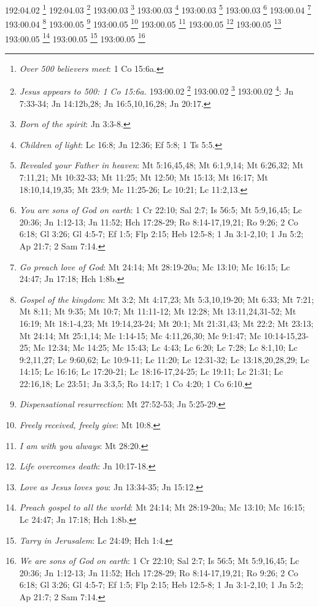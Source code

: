 192:04.02 \footnote{\textit{Over 500 believers meet}: 1 Co 15:6a.}
192:04.03 \footnote{\textit{Jesus appears to 500: 1 Co 15:6a.}
193:00.02 \footnote{\textit{Jesus' discourse to leaders}: Lc 24:44-48.}
193:00.02 \footnote{\textit{Told of death & resurrection}: Mt 16:21; Mt 17:22-23a; Mt 20:17-19; Mt 27:63; Mc 8:31; Mc 9:31; Mc 10:32-34; Lc 9:22,31,43b-44; Lc 18:31-33; Lc 24:7,46; Jn 14:28a; Jn 20:9.}
193:00.02 \footnote{\textit{Told}: Jesus must return to Father}: Jn 7:33-34; Jn 14:12b,28; Jn 16:5,10,16,28; Jn 20:17.}
193:00.03 \footnote{\textit{Born of the spirit}: Jn 3:3-8.}
193:00.03 \footnote{\textit{Children of light}: Lc 16:8; Jn 12:36; Ef 5:8; 1 Ts 5:5.}
193:00.03 \footnote{\textit{Revealed your Father in heaven}: Mt 5:16,45,48; Mt 6:1,9,14; Mt 6:26,32; Mt 7:11,21; Mt 10:32-33; Mt 11:25; Mt 12:50; Mt 15:13; Mt 16:17; Mt 18:10,14,19,35; Mt 23:9; Mc 11:25-26; Lc 10:21; Lc 11:2,13.}
193:00.03 \footnote{\textit{You are sons of God on earth}: 1 Cr 22:10; Sal 2:7; Is 56:5; Mt 5:9,16,45; Lc 20:36; Jn 1:12-13; Jn 11:52; Hch 17:28-29; Ro 8:14-17,19,21; Ro 9:26; 2 Co 6:18; Gl 3:26; Gl 4:5-7; Ef 1:5; Flp 2:15; Heb 12:5-8; 1 Jn 3:1-2,10; 1 Jn 5:2; Ap 21:7; 2 Sam 7:14.}
193:00.04 \footnote{\textit{Go preach love of God}: Mt 24:14; Mt 28:19-20a; Mc 13:10; Mc 16:15; Lc 24:47; Jn 17:18; Hch 1:8b.}
193:00.04 \footnote{\textit{Gospel of the kingdom}: Mt 3:2; Mt 4:17,23; Mt 5:3,10,19-20; Mt 6:33; Mt 7:21; Mt 8:11; Mt 9:35; Mt 10:7; Mt 11:11-12; Mt 12:28; Mt 13:11,24,31-52; Mt 16:19; Mt 18:1-4,23; Mt 19:14,23-24; Mt 20:1; Mt 21:31,43; Mt 22:2; Mt 23:13; Mt 24:14; Mt 25:1,14; Mc 1:14-15; Mc 4:11,26,30; Mc 9:1:47; Mc 10:14-15,23-25; Mc 12:34; Mc 14:25; Mc 15:43; Lc 4:43; Lc 6:20; Lc 7:28; Lc 8:1,10; Lc 9:2,11,27; Lc 9:60,62; Lc 10:9-11; Lc 11:20; Lc 12:31-32; Lc 13:18,20,28,29; Lc 14:15; Lc 16:16; Lc 17:20-21; Lc 18:16-17,24-25; Lc 19:11; Lc 21:31; Lc 22:16,18; Lc 23:51; Jn 3:3,5; Ro 14:17; 1 Co 4:20; 1 Co 6:10.}
193:00.05 \footnote{\textit{Dispensational resurrection}: Mt 27:52-53; Jn 5:25-29.}
193:00.05 \footnote{\textit{Freely received, freely give}: Mt 10:8.}
193:00.05 \footnote{\textit{I am with you always}: Mt 28:20.}
193:00.05 \footnote{\textit{Life overcomes death}: Jn 10:17-18.}
193:00.05 \footnote{\textit{Love as Jesus loves you}: Jn 13:34-35; Jn 15:12.}
193:00.05 \footnote{\textit{Preach gospel to all the world}: Mt 24:14; Mt 28:19-20a; Mc 13:10; Mc 16:15; Lc 24:47; Jn 17:18; Hch 1:8b.}
193:00.05 \footnote{\textit{Tarry in Jerusalem}: Lc 24:49; Hch 1:4.}
193:00.05 \footnote{\textit{We are sons of God on earth}: 1 Cr 22:10; Sal 2:7; Is 56:5; Mt 5:9,16,45; Lc 20:36; Jn 1:12-13; Jn 11:52; Hch 17:28-29; Ro 8:14-17,19,21; Ro 9:26; 2 Co 6:18; Gl 3:26; Gl 4:5-7; Ef 1:5; Flp 2:15; Heb 12:5-8; 1 Jn 3:1-2,10; 1 Jn 5:2; Ap 21:7; 2 Sam 7:14.}
